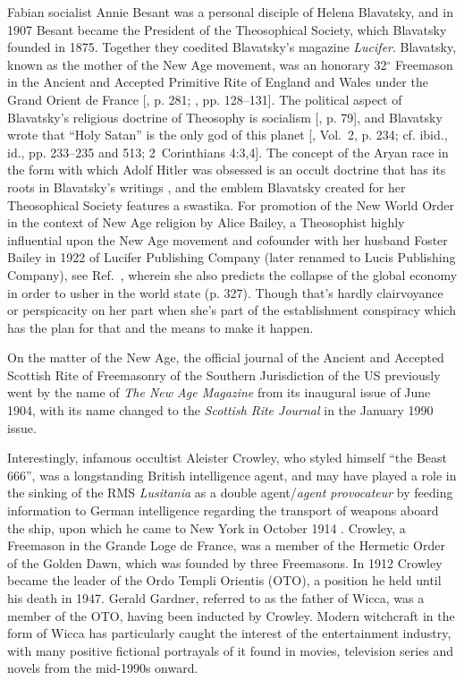 \documentclass[letterpaper,12pt]{article}
\begin{document}
{    Fabian socialist Annie Besant was a personal disciple of Helena Blavatsky, and in 1907 Besant became the President of the Theosophical Society, which Blavatsky founded in 1875. Together they coedited Blavatsky's magazine \emph{Lucifer}. Blavatsky, known as the mother of the New Age movement, was an honorary 32\( ^{\circ} \) Freemason in the Ancient and Accepted Primitive Rite of England and Wales under the Grand Orient de France [, p. 281; , pp. 128--131]. The political aspect of Blavatsky's religious doctrine of Theosophy is socialism [, p. 79], and Blavatsky wrote that ``Holy Satan'' is the only god of this planet [, Vol.~2, p. 234; cf. ibid., id., pp. 233--235 and 513; 2~Corinthians 4:3,4]. The concept of the Aryan race in the form with which Adolf Hitler was obsessed is an occult doctrine that has its roots in Blavatsky's writings \cite{SpielvogelRedles1986}, and the emblem Blavatsky created for her Theosophical Society features a swastika. For promotion of the New World Order in the context of New Age religion by Alice Bailey, a Theosophist highly influential upon the New Age movement and cofounder with her husband Foster Bailey in 1922 of Lucifer Publishing Company (later renamed to Lucis Publishing Company), see Ref.~, wherein she also predicts the collapse of the global economy in order to usher in the world state (p. 327). Though that's hardly clairvoyance or perspicacity on her part when she's part of the establishment conspiracy which has the plan for that and the means to make it happen.\par
    On the matter of the New Age, the official journal of the Ancient and Accepted Scottish Rite of Freemasonry of the Southern Jurisdiction of the US previously went by the name of \emph{The New Age Magazine} from its inaugural issue of June 1904, with its name changed to the \emph{Scottish Rite Journal} in the January 1990 issue.\par
    Interestingly, infamous occultist Aleister Crowley, who styled himself ``the Beast 666'', was a longstanding British intelligence agent, and may have played a role in the sinking of the RMS \emph{Lusitania} as a double agent\slash \emph{agent provocateur} by feeding information to German intelligence regarding the transport of weapons aboard the ship, upon which he came to New York in October 1914 \cite{Spence2000,Spence2008}. Crowley, a Freemason in the Grande Loge de France, was a member of the Hermetic Order of the Golden Dawn, which was founded by three Freemasons. In 1912 Crowley became the leader of the Ordo Templi Orientis (OTO), a position he held until his death in 1947. Gerald Gardner, referred to as the father of Wicca, was a member of the OTO, having been inducted by Crowley. Modern witchcraft in the form of Wicca has particularly caught the interest of the entertainment industry, with many positive fictional portrayals of it found in movies, television series and novels from the mid-1990s onward.\par
}
\end{document}
